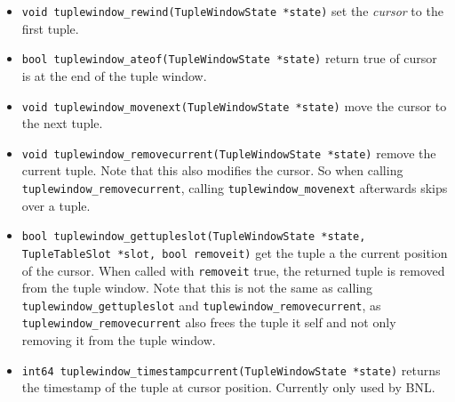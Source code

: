 \begin{itemize}
\item \lstinline|void tuplewindow_rewind(TupleWindowState *state)|
set the \emph{cursor} to the first tuple.

\item \lstinline|bool tuplewindow_ateof(TupleWindowState *state)|
return true of cursor is at the end of the tuple window.

\item \lstinline|void tuplewindow_movenext(TupleWindowState *state)|
move the cursor to the next tuple.

\item \lstinline|void tuplewindow_removecurrent(TupleWindowState *state)|
remove the current tuple.  Note that this also modifies the cursor.
So when calling \lstinline|tuplewindow_removecurrent|, calling
\lstinline|tuplewindow_movenext| afterwards skips over a tuple.

\item \lstinline|bool tuplewindow_gettupleslot(TupleWindowState *state, TupleTableSlot *slot, bool removeit)|
get the tuple a the current position of the cursor.  When called with
\lstinline|removeit| true, the returned tuple is removed from the
tuple window.  Note that this is not the same as calling
\lstinline|tuplewindow_gettupleslot| and
\lstinline|tuplewindow_removecurrent|, as
\lstinline|tuplewindow_removecurrent| also frees the tuple it self and
not only removing it from the tuple window.

\item \lstinline|int64 tuplewindow_timestampcurrent(TupleWindowState *state)|
returns the timestamp of the tuple at cursor position.  Currently only
used by BNL.

\end{itemize}



